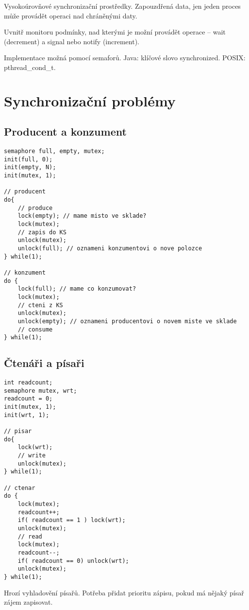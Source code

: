 \documentclass[a4paper, 11pt]{report}
\begin{document}
Vysokoúrovňové synchronizační prostředky. Zapouzdřená data, jen jeden proces může provádět operaci nad chráněnými daty.

Uvnitř monitoru podmínky, nad kterými je možní provádět operace -- wait (decrement) a signal nebo notify (increment).

Implementace možná pomocí semaforů. Java: klíčové slovo synchronized. POSIX: pthread\_cond\_t.

\section{Synchronizační problémy}

\subsection{Producent a konzument}

\begin{lstlisting}
semaphore full, empty, mutex;
init(full, 0);
init(empty, N);
init(mutex, 1);

// producent
do{
	// produce
	lock(empty); // mame misto ve sklade?
	lock(mutex);
	// zapis do KS
	unlock(mutex);
	unlock(full); // oznameni konzumentovi o nove polozce
} while(1);

// konzument
do {
	lock(full); // mame co konzumovat?
	lock(mutex);
	// cteni z KS
	unlock(mutex);
	unlock(empty); // oznameni producentovi o novem miste ve sklade
	// consume
} while(1);
\end{lstlisting}

\subsection{Čtenáři a písaři}

\begin{lstlisting}
int readcount;
semaphore mutex, wrt;
readcount = 0;
init(mutex, 1);
init(wrt, 1);

// pisar
do{
	lock(wrt);
	// write
	unlock(mutex);
} while(1);

// ctenar
do {
	lock(mutex);
	readcount++;
	if( readcount == 1 ) lock(wrt);
	unlock(mutex);
	// read
	lock(mutex);
	readcount--;
	if( readcount == 0) unlock(wrt);
	unlock(mutex);
} while(1);
\end{lstlisting}

Hrozí vyhladovění písařů. Potřeba přidat prioritu zápisu, pokud má nějaký písař zájem zapisovat.
\end{document}
